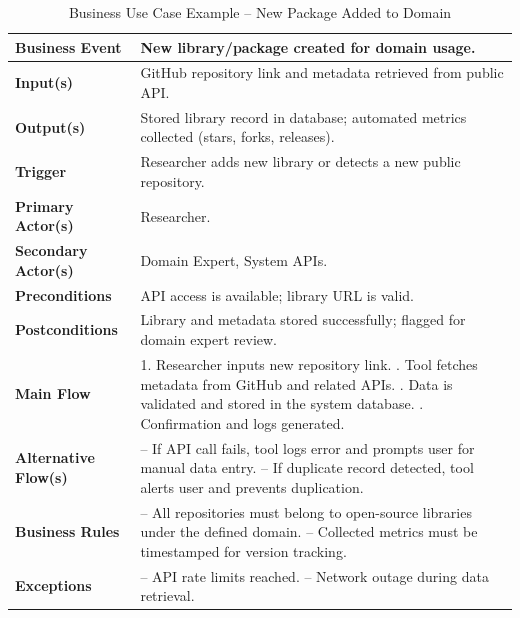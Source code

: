 \documentclass[12pt]{article}
\begin{document}
\begin{table}[H]
\centering
\caption{Business Use Case Example – New Package Added to Domain}
\setlength{\tabcolsep}{4pt}
\renewcommand{\arraystretch}{1.2}
\footnotesize

\begin{tabularx}{\textwidth}{p{3cm} Y}
\toprule
\textbf{Business Event} & New library/package created for domain usage. \\
\midrule
{}
\textbf{Input(s)} & GitHub repository link and metadata retrieved from public API. \\
\hline
\textbf{Output(s)} & Stored library record in database; automated metrics collected (stars, forks, releases). \\
\hline
\textbf{Trigger} & Researcher adds new library or detects a new public repository. \\
\hline
\textbf{Primary Actor(s)} & Researcher. \\
\hline
\textbf{Secondary Actor(s)} & Domain Expert, System APIs. \\
\hline
\textbf{Preconditions} & API access is available; library URL is valid. \\
\hline
\textbf{Postconditions} & Library and metadata stored successfully; flagged for domain expert review. \\
\hline
\textbf{Main Flow} &
1. Researcher inputs new repository link. . Tool fetches metadata from GitHub and related APIs. . Data is validated and stored in the system database. . Confirmation and logs generated. \\
\hline
\textbf{Alternative Flow(s)} &
– If API call fails, tool logs error and prompts user for manual data entry. \newline
– If duplicate record detected, tool alerts user and prevents duplication. \\
\hline
\textbf{Business Rules} &
– All repositories must belong to open-source libraries under the defined domain. \newline
– Collected metrics must be timestamped for version tracking. \\
\hline
\textbf{Exceptions} &
– API rate limits reached. \newline
– Network outage during data retrieval. \\
\bottomrule
\end{tabularx}
\end{table}
\end{document}
